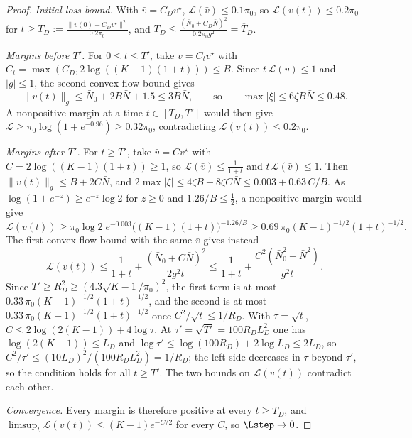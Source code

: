 \begin{proof}
\emph{Initial loss bound.} With $\bar v=C_Dv^\star$, $\mathcal L(\bar v)\le0.1\pi_0$, so $\mathcal L(v(t))\le0.2\pi_0$ for
$t\ge T_D:=\tfrac{\|v(0)-C_Dv^\star\|^2}{0.2\pi_0}$, and $T_D\le\tfrac{(\bar N_0+C_D\bar N)^2}{0.2\pi_0g^2}=\overline T_D$.

\emph{Margins before $T'$.} For $0\le t\le T'$, take $\bar v=C_tv^\star$ with $C_t=\max(C_D,2\log((K-1)(1+t)))\le B$. Since
$t\,\mathcal L(\bar v)\le1$ and $|g|\le1$, the second convex-flow bound gives
\[
 \|v(t)\|_g\le\bar N_0+2B\bar N+1.5\le3B\bar N,
 \qquad\text{so}\qquad
 \max|\xi|\le6\zeta B\bar N\le0.48 .
\]
A nonpositive margin at a time $t\in[T_D,T']$ would then give $\mathcal L\ge\pi_0\log(1+e^{-0.96})\ge0.32\pi_0$, contradicting
$\mathcal L(v(t))\le0.2\pi_0$.

\emph{Margins after $T'$.} For $t\ge T'$, take $\bar v=Cv^\star$ with $C=2\log((K-1)(1+t))\ge1$, so $\mathcal L(\bar v)\le\tfrac1{1+t}$ and
$t\,\mathcal L(\bar v)\le1$. Then $\|v(t)\|_g\le B+2C\bar N$, and $2\max|\xi|\le4\zeta B+8\zeta C\bar N\le0.003+0.63\,C/B$. As
$\log(1+e^{-z})\ge e^{-z}\log2$ for $z\ge0$ and $1.26/B\le\tfrac12$, a nonpositive margin would give
\[
 \mathcal L(v(t))\ge\pi_0\log2\;e^{-0.003}\bigl((K-1)(1+t)\bigr)^{-1.26/B}\ge0.69\,\pi_0(K-1)^{-1/2}(1+t)^{-1/2}.
\]
The first convex-flow bound with the same $\bar v$ gives instead
\[
 \mathcal L(v(t))\le\frac1{1+t}+\frac{(\bar N_0+C\bar N)^2}{2g^2t}\le\frac1{1+t}+\frac{C^2(\bar N_0^2+\bar N^2)}{g^2t}.
\]
Since $T'\ge R_D^2\ge(4.3\sqrt{K-1}/\pi_0)^2$, the first term is at most $0.33\,\pi_0(K-1)^{-1/2}(1+t)^{-1/2}$, and the second is at
most $0.33\,\pi_0(K-1)^{-1/2}(1+t)^{-1/2}$ once $C^2/\sqrt t\le1/R_D$. With $\tau=\sqrt t$, $C\le2\log(2(K-1))+4\log\tau$. At
$\tau'=\sqrt{T'}=100R_DL_D^2$ one has $\log(2(K-1))\le L_D$ and $\log\tau'\le\log(100R_D)+2\log L_D\le2L_D$, so
$C^2/\tau'\le(10L_D)^2/(100R_DL_D^2)=1/R_D$; the left side decreases in $\tau$ beyond $\tau'$, so the condition holds for all $t\ge T'$.
The two bounds on $\mathcal L(v(t))$ contradict each other.

\emph{Convergence.} Every margin is therefore positive at every $t\ge T_D$, and $\limsup_t\mathcal L(v(t))\le(K-1)e^{-C/2}$ for every $C$,
so $\Lstep\to0$.
\end{proof}

